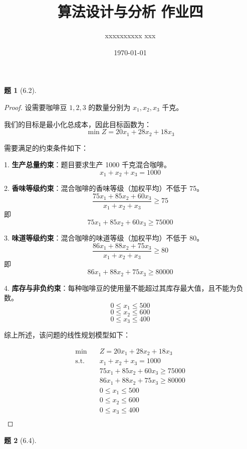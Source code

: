 \documentclass[11pt, a4paper]{article}
\title{算法设计与分析 作业四}
\author{xxxxxxxxxx xxx}
\date{\today}
\newtheorem{problem}{题}
\begin{document}
\maketitle

\begin{problem}[6.2]
\end{problem}

\begin{proof}
    设需要咖啡豆 $1, 2, 3$ 的数量分别为 $x_1, x_2, x_3$ 千克。

    我们的目标是最小化总成本，因此目标函数为：
    $$ \min Z = 20x_1 + 28x_2 + 18x_3 $$

    需要满足的约束条件如下：

    1. \textbf{生产总量约束}：题目要求生产 1000 千克混合咖啡。
    $$ x_1 + x_2 + x_3 = 1000 $$

    2. \textbf{香味等级约束}：混合咖啡的香味等级（加权平均）不低于 75。
    $$ \frac{75x_1 + 85x_2 + 60x_3}{x_1 + x_2 + x_3} \ge 75 $$
    即
    $$ 75x_1 + 85x_2 + 60x_3 \ge 75000 $$

    3. \textbf{味道等级约束}：混合咖啡的味道等级（加权平均）不低于 80。
    $$ \frac{86x_1 + 88x_2 + 75x_3}{x_1 + x_2 + x_3} \ge 80 $$
    即
    $$ 86x_1 + 88x_2 + 75x_3 \ge 80000 $$

    4. \textbf{库存与非负约束}：每种咖啡豆的使用量不能超过其库存最大值，且不能为负数。
    $$ 0 \le x_1 \le 500 $$
    $$ 0 \le x_2 \le 600 $$
    $$ 0 \le x_3 \le 400 $$

    综上所述，该问题的线性规划模型如下：

    $$
        \begin{aligned}
            \min \quad & Z = 20x_1 + 28x_2 + 18x_3       \\
            \text{s.t.} \quad
                       & x_1 + x_2 + x_3 = 1000          \\
                       & 75x_1 + 85x_2 + 60x_3 \ge 75000 \\
                       & 86x_1 + 88x_2 + 75x_3 \ge 80000 \\
                       & 0 \le x_1 \le 500               \\
                       & 0 \le x_2 \le 600               \\
                       & 0 \le x_3 \le 400               \\
        \end{aligned}
    $$
\end{proof}

\begin{problem}[6.4]
\end{problem}
\end{document}
